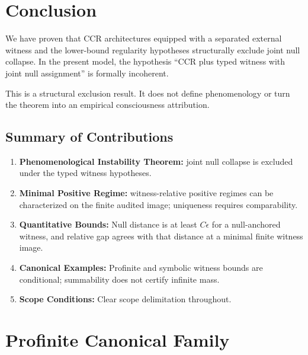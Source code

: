\documentclass[11pt,a4paper]{article}
\theoremstyle{plain}
\theoremstyle{definition}
\theoremstyle{remark}
\begin{document}
\section{Conclusion}

We have proven that CCR architectures equipped with a separated external witness and the lower-bound regularity hypotheses structurally exclude joint null collapse. In the present model, the hypothesis ``CCR plus typed witness with joint null assignment'' is formally incoherent.

This is a structural exclusion result. It does not define phenomenology or turn the theorem into an empirical consciousness attribution.

\subsection{Summary of Contributions}

\begin{enumerate}
\item \textbf{Phenomenological Instability Theorem:} joint null collapse is excluded under the typed witness hypotheses.
\item \textbf{Minimal Positive Regime:} witness-relative positive regimes can be characterized on the finite audited image; uniqueness requires comparability.
\item \textbf{Quantitative Bounds:} Null distance is at least $C\epsilon$ for a null-anchored witness, and relative gap agrees with that distance at a minimal finite witness image.
\item \textbf{Canonical Examples:} Profinite and symbolic witness bounds are conditional; summability does not certify infinite mass.
\item \textbf{Scope Conditions:} Clear scope delimitation throughout.
\end{enumerate}

\appendix
\section{Profinite Canonical Family}
\end{document}
